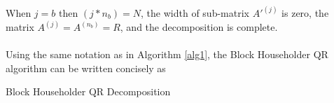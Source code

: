 \documentclass{article}
\begin{document}
\paragraph{}
When $j = b$ then $(j * n_b) = N$, the width of sub-matrix $A'^{(j)}$ is zero, the matrix $A^{(j)} = A^{(n_b)} = R$, and the decomposition is complete.

\paragraph{}
Using the same notation as in Algorithm \ref{alg1}, the Block Householder QR algorithm can be written concisely as
\begin{algorithm}
\label{blockqr}
\caption{Block Householder QR Decomposition}
\begin{algorithmic}

\ENDFOR
\end{algorithmic}
\end{algorithm}



\end{document}
